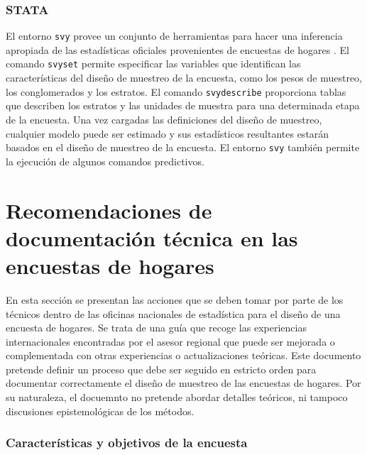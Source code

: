 \documentclass[
  10pt,
  spanish,
]{book}
\begin{document}
\hypertarget{stata}{%
\subsection*{STATA}\label{stata}}

El entorno \texttt{svy} provee un conjunto de herramientas para hacer una inferencia apropiada de las estadísticas oficiales provenientes de encuestas de hogares \citep{STATA_2017}. El comando \texttt{svyset} permite especificar las variables que identifican las características del diseño de muestreo de la encuesta, como los pesos de muestreo, los conglomerados y los estratos. El comando \texttt{svydescribe} proporciona tablas que describen los estratos y las unidades de muestra para una determinada etapa de la encuesta. Una vez cargadas las definiciones del diseño de muestreo, cualquier modelo puede ser estimado y sus estadísticos resultantes estarán basados en el diseño de muestreo de la encuesta. El entorno \texttt{svy} también permite la ejecución de algunos comandos predictivos.

\hypertarget{recomendaciones-de-documentaciuxf3n-tuxe9cnica-en-las-encuestas-de-hogares}{%
\chapter{Recomendaciones de documentación técnica en las encuestas de hogares}\label{recomendaciones-de-documentaciuxf3n-tuxe9cnica-en-las-encuestas-de-hogares}}

En esta sección se presentan las acciones que se deben tomar por parte de los técnicos dentro de las oficinas nacionales de estadística para el diseño de una encuesta de hogares. Se trata de una guía que recoge las experiencias internacionales encontradas por el asesor regional que puede ser mejorada o complementada con otras experiencias o actualizaciones teóricas. Este documento pretende definir un proceso que debe ser seguido en estricto orden para documentar correctamente el diseño de muestreo de las encuestas de hogares. Por su naturaleza, el docuemnto no pretende abordar detalles teóricos, ni tampoco discusiones epistemológicas de los métodos.

\hypertarget{caracteruxedsticas-y-objetivos-de-la-encuesta}{%
\subsection*{Características y objetivos de la encuesta}\label{caracteruxedsticas-y-objetivos-de-la-encuesta}}
\end{document}
